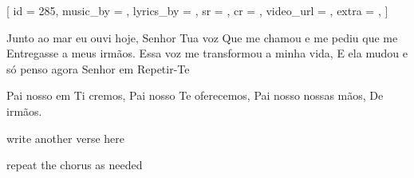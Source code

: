 [
    id          = {285},
    music_by    = {},
    lyrics_by   = {},
    sr          = {},
    cr          = {},
    video_url   = {},
    extra       = {},
]

\beginverse
Junto ao mar eu ouvi hoje, Senhor Tua voz
Que me chamou e me pediu que me
Entregasse a meus irmãos.
Essa voz me transformou a minha vida,
E ela mudou e só penso agora Senhor em
Repetir-Te
\endverse

\beginchorus
Pai nosso em Ti cremos,
Pai nosso Te oferecemos,
Pai nosso nossas mãos,
De irmãos.
\endchorus

\beginverse
write another verse here
\endverse

\beginchorus
repeat the chorus as needed
\endchorus

\endsong
